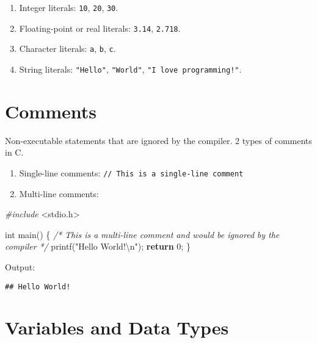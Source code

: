 \documentclass[
]{article}
\newenvironment{Shaded}{\begin{snugshade}}{\end{snugshade}}
\newcommand{\CommentTok}[1]{\textcolor[rgb]{0.56,0.35,0.01}{\textit{#1}}}
\newcommand{\ControlFlowTok}[1]{\textcolor[rgb]{0.13,0.29,0.53}{\textbf{#1}}}
\newcommand{\DataTypeTok}[1]{\textcolor[rgb]{0.13,0.29,0.53}{#1}}
\newcommand{\DecValTok}[1]{\textcolor[rgb]{0.00,0.00,0.81}{#1}}
\newcommand{\ImportTok}[1]{#1}
\newcommand{\NormalTok}[1]{#1}
\newcommand{\PreprocessorTok}[1]{\textcolor[rgb]{0.56,0.35,0.01}{\textit{#1}}}
\newcommand{\SpecialCharTok}[1]{\textcolor[rgb]{0.00,0.00,0.00}{#1}}
\newcommand{\StringTok}[1]{\textcolor[rgb]{0.31,0.60,0.02}{#1}}
\providecommand{\tightlist}{%
  \setlength{\itemsep}{0pt}\setlength{\parskip}{0pt}}
\begin{document}
\begin{enumerate}
\def\labelenumi{\arabic{enumi}.}
\tightlist
\item
  Integer literals: \texttt{10}, \texttt{20}, \texttt{30}.
\item
  Floating-point or real literals: \texttt{3.14}, \texttt{2.718}.
\item
  Character literals: \texttt{\textquotesingle{}a\textquotesingle{}},
  \texttt{\textquotesingle{}b\textquotesingle{}},
  \texttt{\textquotesingle{}c\textquotesingle{}}.
\item
  String literals: \texttt{"Hello"}, \texttt{"World"},
  \texttt{"I\ love\ programming!"}.
\end{enumerate}

\hypertarget{comments}{%
\section{Comments}\label{comments}}

Non-executable statements that are ignored by the compiler. 2 types of
comments in C.

\begin{enumerate}
\def\labelenumi{\arabic{enumi}.}
\tightlist
\item
  Single-line comments: \texttt{//\ This\ is\ a\ single-line\ comment}
\item
  Multi-line comments:
\end{enumerate}

\begin{Shaded}
\begin{Highlighting}[]
\PreprocessorTok{\#include }\ImportTok{\textless{}stdio.h\textgreater{}}

\DataTypeTok{int}\NormalTok{ main() \{}
    \CommentTok{/*}
\CommentTok{        This is a}
\CommentTok{        multi{-}line comment}
\CommentTok{        and would be ignored}
\CommentTok{        by the compiler}
\CommentTok{    */}
\NormalTok{    printf(}\StringTok{"Hello World!}\SpecialCharTok{\textbackslash{}n}\StringTok{"}\NormalTok{);}
    \ControlFlowTok{return} \DecValTok{0}\NormalTok{;}
\NormalTok{\}}
\end{Highlighting}
\end{Shaded}

Output:

\begin{verbatim}
## Hello World!
\end{verbatim}

\hypertarget{variables-and-data-types}{%
\section{Variables and Data Types}\label{variables-and-data-types}}
\end{document}
